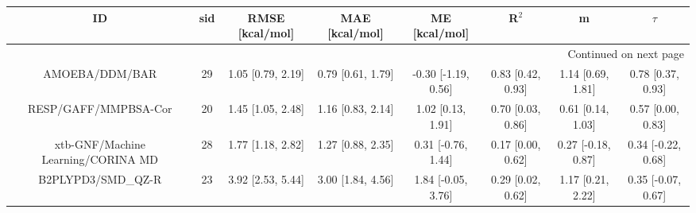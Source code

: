 \documentclass[8pt]{article}
\begin{document}
\begin{center}
\begin{footnotesize}
\begin{longtable}{|cccccccc|}
\toprule
                                 ID & sid &    RMSE [kcal/mol] &     MAE [kcal/mol] &        ME [kcal/mol] &              R$^2$ &                   m &              $\tau$ \\
\midrule
\endhead
\midrule
\multicolumn{8}{r}{{Continued on next page}} \\
\midrule
\endfoot

\bottomrule
\endlastfoot
                     AMOEBA/DDM/BAR &  29 &  1.05 [0.79, 2.19] &  0.79 [0.61, 1.79] &  -0.30 [-1.19, 0.56] &  0.83 [0.42, 0.93] &   1.14 [0.69, 1.81] &   0.78 [0.37, 0.93] \\
               RESP/GAFF/MMPBSA-Cor &  20 &  1.45 [1.05, 2.48] &  1.16 [0.83, 2.14] &    1.02 [0.13, 1.91] &  0.70 [0.03, 0.86] &   0.61 [0.14, 1.03] &   0.57 [0.00, 0.83] \\
 xtb-GNF/Machine Learning/CORINA MD &  28 &  1.77 [1.18, 2.82] &  1.27 [0.88, 2.35] &   0.31 [-0.76, 1.44] &  0.17 [0.00, 0.62] &  0.27 [-0.18, 0.87] &  0.34 [-0.22, 0.68] \\
                 B2PLYPD3/SMD\_QZ-R &  23 &  3.92 [2.53, 5.44] &  3.00 [1.84, 4.56] &   1.84 [-0.05, 3.76] &  0.29 [0.02, 0.62] &   1.17 [0.21, 2.22] &  0.35 [-0.07, 0.67] \\
\end{longtable}
\end{footnotesize}
\end{center}
\end{document}
